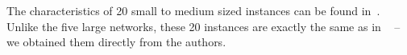 \documentclass[dvipsnames,format=sigconf]{acmart} %
\begin{document}
\begin{comment}
    \begin{table}
 	\caption{Large-sized instance characteristics.}
 	\label{tab:big_instances_chars}  
 	\begin{tabular}{lrr}
 		City      & $|V|$ & $|E|$ \\ \hline
 		Belgrade      & 19,586 & 7,561,185  \\ 
 		Berlin        & 29,461 & 9,944,851 \\
 	    Boston        & 44,797 & 28,164,740 \\
 	    Dublin        & 37,982 & 21,630,466 \\
 	    Minsk         & 10,487 & 1,375,618 \\ \hline
 	\end{tabular}
 \end{table}
 
 
  \begin{table}
 	\caption{Small to medium sized instances characteristics.}
 	\label{tab:small_instances_chars}  
 	\begin{tabular}{lrr|lrr}
 		City      & $|V|$ & $|E|$ 			& City     & $|V|$ & $|E|$ \\ \hline
 		Bath&910&18560&Liverpool&1273&42564\\
 		Belfast&1700&62617&Manchester&1991&77286\\
 		Brighton&976&35012&Newcastle&1109&26614\\
 		Bristol&1569&47522&Nottingham&1739&51595\\
 		Cardiff&1127&23155&Oxford&479&8396\\
 		Coventry&1175&26689&Plymouth&1122&35070\\
 		Exeter&1250&31997&Sheffield&1582&50534\\
 		Glasgow&1137&24323&Southampton&796&19942\\
 		Leeds&1647&56511&Sunderland&1346&42013\\
 		Leicester&1531&48219&York&1044&23774\\
 		
 		\hline
 	\end{tabular}
 \end{table}
 
\end{comment}

 
 The characteristics of 20 small to medium sized instances can be found in~\cite{corcoran2021heuristics}.
 Unlike the five large networks, these 20 instances are exactly the same as in ~\cite{corcoran2021heuristics} -- we obtained them directly from the authors.
\end{document}
